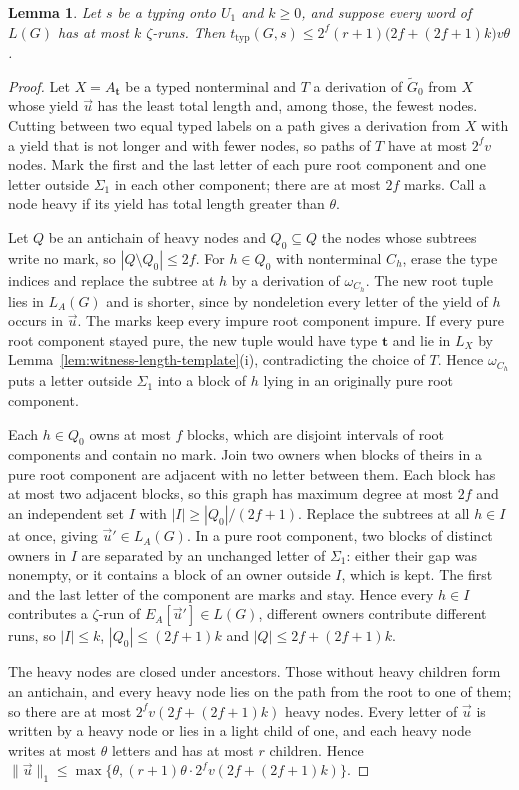 \documentclass[11pt]{article}
\numberwithin{equation}{section}
\theoremstyle{plain}
\newtheorem{lemma}[theorem]{Lemma}
\theoremstyle{definition}
\theoremstyle{remark}
\newcommand{\tuple}[1]{\vec{#1}}
\theoremstyle{plain}
\begin{document}
\begin{lemma}\label{lem:app-u1-runs}
Let $s$ be a typing onto $U_1$ and $k\ge0$, and suppose every word of $L(G)$ has
at most $k$ $\zeta$-runs.  Then
$t_{\mathrm{typ}}(G,s)\le2^f(r+1)\bigl(2f+(2f+1)k\bigr)v\theta$.
\end{lemma}

\begin{proof}
Let $X=A_{\mathbf t}$ be a typed nonterminal and $T$ a derivation of
$\widetilde G_0$ from $X$ whose yield $\tuple u$ has the least total length and,
among those, the fewest nodes.  Cutting between two equal typed labels on a path
gives a derivation from $X$ with a yield that is not longer and with fewer
nodes, so paths of $T$ have at most $2^fv$ nodes.  Mark the first and the last
letter of each pure root component and one letter outside $\Sigma_1$ in each
other component; there are at most $2f$ marks.  Call a node heavy if its yield
has total length greater than $\theta$.

Let $Q$ be an antichain of heavy nodes and $Q_0\subseteq Q$ the nodes whose
subtrees write no mark, so $|Q\setminus Q_0|\le2f$.  For $h\in Q_0$ with
nonterminal $C_h$, erase the type indices and replace the subtree at $h$ by a
derivation of $\omega_{C_h}$.  The new root tuple lies in $L_A(G)$ and is shorter,
since by nondeletion every letter of the yield of $h$ occurs in $\tuple u$.  The
marks keep every impure root component impure.  If every pure root component
stayed pure, the new tuple would have type $\mathbf t$ and lie in $L_X$ by
Lemma~\ref{lem:witness-length-template}(i), contradicting the choice of $T$.
Hence $\omega_{C_h}$ puts a letter outside $\Sigma_1$ into a block of $h$ lying in
an originally pure root component.

Each $h\in Q_0$ owns at most $f$ blocks, which are disjoint intervals of root
components and contain no mark.  Join two owners when blocks of theirs in a pure
root component are adjacent with no letter between them.  Each block has at most
two adjacent blocks, so this graph has maximum degree at most $2f$ and an
independent set $I$ with $|I|\ge|Q_0|/(2f+1)$.  Replace the subtrees at all
$h\in I$ at once, giving $\tuple u'\in L_A(G)$.  In a pure root component, two
blocks of distinct owners in $I$ are separated by an unchanged letter of
$\Sigma_1$: either their gap was nonempty, or it contains a block of an owner
outside $I$, which is kept.  The first and the last letter of the component are
marks and stay.  Hence every $h\in I$ contributes a $\zeta$-run of
$E_A[\tuple u']\in L(G)$, different owners contribute different runs, so
$|I|\le k$, $|Q_0|\le(2f+1)k$ and $|Q|\le2f+(2f+1)k$.

The heavy nodes are closed under ancestors.  Those without heavy children form
an antichain, and every heavy node lies on the path from the root to one of
them; so there are at most $2^fv(2f+(2f+1)k)$ heavy nodes.  Every letter of
$\tuple u$ is written by a heavy node or lies in a light child of one, and each
heavy node writes at most $\theta$ letters and has at most $r$ children.  Hence
$\|\tuple u\|_1\le\max\{\theta,(r+1)\theta\cdot2^fv(2f+(2f+1)k)\}$.
\end{proof}
\end{document}
